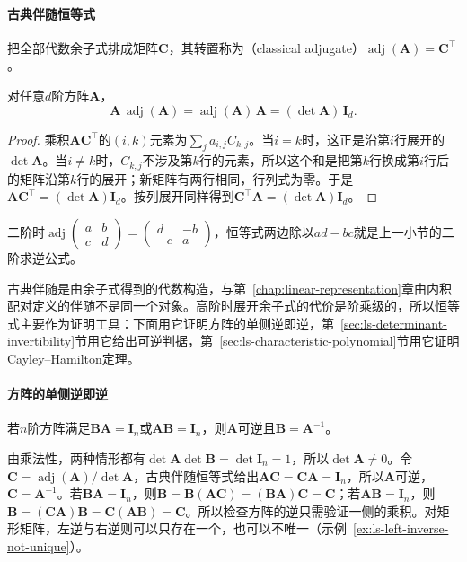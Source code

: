 \paragraph{古典伴随恒等式}
把全部代数余子式排成矩阵$\bm C$，其转置称为（classical adjugate）$\operatorname{adj}(\bm A)=\bm C^\top$。
\begin{theorem}[古典伴随恒等式]
\label{thm:ls-adjugate-identity}
对任意$d$阶方阵$\bm A$，
\[
 \bm A\,\operatorname{adj}(\bm A)
 =\operatorname{adj}(\bm A)\,\bm A
 =(\det\bm A)\,\bm I_d.
\]
\end{theorem}
\begin{proof}
乘积$\bm A\bm C^\top$的$(i,k)$元素为$\sum_j a_{i,j}C_{k,j}$。当$i=k$时，这正是沿第$i$行展开的$\det\bm A$。当$i\neq k$时，$C_{k,j}$不涉及第$k$行的元素，所以这个和是把第$k$行换成第$i$行后的矩阵沿第$k$行的展开；新矩阵有两行相同，行列式为零。于是$\bm A\bm C^\top=(\det\bm A)\bm I_d$。按列展开同样得到$\bm C^\top\bm A=(\det\bm A)\bm I_d$。
\end{proof}
二阶时$\operatorname{adj}\left(\begin{smallmatrix}a&b\\c&d\end{smallmatrix}\right)=\left(\begin{smallmatrix}d&-b\\-c&a\end{smallmatrix}\right)$，恒等式两边除以$ad-bc$就是上一小节的二阶求逆公式。

古典伴随是由余子式得到的代数构造，与第~\ref{chap:linear-representation}章由内积配对定义的伴随不是同一个对象。高阶时展开余子式的代价是阶乘级的，所以恒等式主要作为证明工具：下面用它证明方阵的单侧逆即逆，第~\ref{sec:ls-determinant-invertibility}节用它给出可逆判据，第~\ref{sec:ls-characteristic-polynomial}节用它证明Cayley--Hamilton定理。

\paragraph{方阵的单侧逆即逆}
\label{sec:ls-square-one-sided-inverse}
若$n$阶方阵满足$\bm B\bm A=\bm I_n$或$\bm A\bm B=\bm I_n$，则$\bm A$可逆且$\bm B=\bm A^{-1}$。

由乘法性，两种情形都有$\det\bm A\det\bm B=\det\bm I_n=1$，所以$\det\bm A\neq0$。令$\bm C=\operatorname{adj}(\bm A)/\det\bm A$，古典伴随恒等式给出$\bm A\bm C=\bm C\bm A=\bm I_n$，所以$\bm A$可逆，$\bm C=\bm A^{-1}$。若$\bm B\bm A=\bm I_n$，则$\bm B=\bm B(\bm A\bm C)=(\bm B\bm A)\bm C=\bm C$；若$\bm A\bm B=\bm I_n$，则$\bm B=(\bm C\bm A)\bm B=\bm C(\bm A\bm B)=\bm C$。所以检查方阵的逆只需验证一侧的乘积。对矩形矩阵，左逆与右逆则可以只存在一个，也可以不唯一（示例~\ref{ex:ls-left-inverse-not-unique}）。

